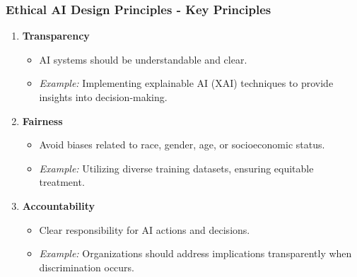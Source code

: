 \documentclass[aspectratio=169]{beamer}
\begin{document}
\begin{frame}[fragile]
    \frametitle{Ethical AI Design Principles - Key Principles}
    \begin{enumerate}
        \item \textbf{Transparency}
        \begin{itemize}
            \item AI systems should be understandable and clear.
            \item \textit{Example:} Implementing explainable AI (XAI) techniques to provide insights into decision-making.
        \end{itemize}
        
        \item \textbf{Fairness}
        \begin{itemize}
            \item Avoid biases related to race, gender, age, or socioeconomic status.
            \item \textit{Example:} Utilizing diverse training datasets, ensuring equitable treatment.
        \end{itemize}
        
        \item \textbf{Accountability}
        \begin{itemize}
            \item Clear responsibility for AI actions and decisions.
            \item \textit{Example:} Organizations should address implications transparently when discrimination occurs.
        \end{itemize}
    \end{enumerate}
\end{frame}
\end{document}
